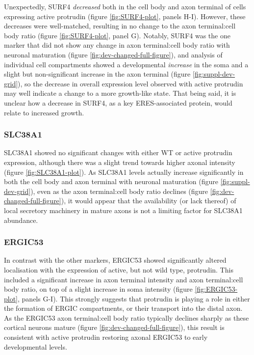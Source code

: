 \documentclass[
  12pt,
  a4paper,
]{book}
\begin{document}
Unexpectedly, SURF4 \emph{decreased} both in the cell body and axon terminal of cells expressing active protrudin (figure \ref{fig:SURF4-plot}, panels H-I). However, these decreases were well-matched, resulting in no change to the axon terminal:cell body ratio (figure \ref{fig:SURF4-plot}, panel G). Notably, SURF4 was the one marker that did not show any change in axon terminal:cell body ratio with neuronal maturation (figure \ref{fig:dev-changed-full-figure}), and analysis of individual cell compartments showed a developmental \emph{increase} in the soma and a slight but non-significant increase in the axon terminal (figure \ref{fig:suppl-dev-grid}), so the decrease in overall expression level observed with active protrudin may well indicate a change to a more growth-like state. That being said, it is unclear how a decrease in SURF4, as a key ERES-associated protein, would relate to increased growth.

\hypertarget{slc38a1}{%
\subsubsection{SLC38A1}\label{slc38a1}}

SLC38A1 showed no significant changes with either WT or active protrudin expression, although there was a slight trend towards higher axonal intensity (figure \ref{fig:SLC38A1-plot}). As SLC38A1 levels actually increase significantly in both the cell body and axon terminal with neuronal maturation (figure \ref{fig:suppl-dev-grid}), even as the axon terminal:cell body ratio declines (figure \ref{fig:dev-changed-full-figure}), it would appear that the availability (or lack thereof) of local secretory machinery in mature axons is not a limiting factor for SLC38A1 abundance.

\hypertarget{ergic53}{%
\subsubsection{ERGIC53}\label{ergic53}}

In contrast with the other markers, ERGIC53 showed significantly altered localisation with the expression of active, but not wild type, protrudin. This included a significant increase in axon terminal intensity and axon terminal:cell body ratio, on top of a slight increase in soma intensity (figure \ref{fig:ERGIC53-plot}, panels G-I). This strongly suggests that protrudin is playing a role in either the formation of ERGIC compartments, or their transport into the distal axon. As the ERGIC53 axon terminal:cell body ratio typically declines sharply as these cortical neurons mature (figure \ref{fig:dev-changed-full-figure}), this result is consistent with active protrudin restoring axonal ERGIC53 to early developmental levels.
\end{document}
